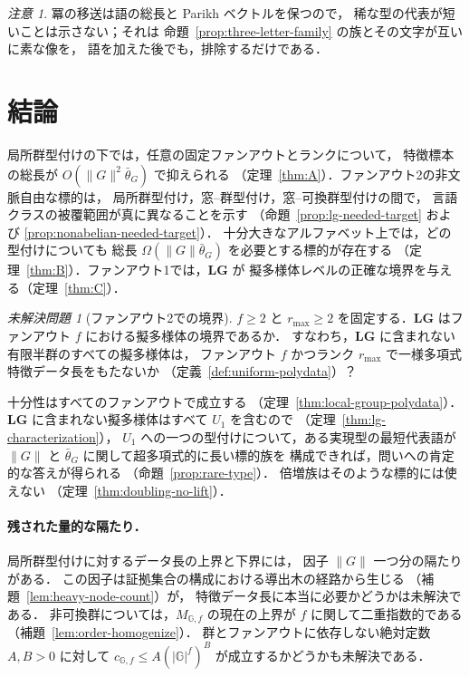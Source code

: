 \documentclass[11pt,a4paper]{ltjsarticle}
\numberwithin{equation}{section}
\theoremstyle{plain}
\theoremstyle{definition}
\theoremstyle{remark}
\newtheorem{remark}[theorem]{注意}
\newtheorem{openproblem}[theorem]{未解決問題}
\theoremstyle{plain}
\begin{document}
\begin{remark}
冪の移送は語の総長と Parikh ベクトルを保つので，
稀な型の代表が短いことは示さない；それは
命題~\ref{prop:three-letter-family} の族とその文字が互いに素な像を，
語を加えた後でも，排除するだけである．
\end{remark}

\section{結論}
\label{sec:conclusion}

局所群型付けの下では，任意の固定ファンアウトとランクについて，
特徴標本の総長が $O(\|G\|^2\bar\theta_G)$ で抑えられる
（定理~\ref{thm:A}）．ファンアウト2の非文脈自由な標的は，
局所群型付け，窓--群型付け，窓--可換群型付けの間で，
言語クラスの被覆範囲が真に異なることを示す
（命題~\ref{prop:lg-needed-target} および
\ref{prop:nonabelian-needed-target}）．
十分大きなアルファベット上では，どの型付けについても
総長 $\Omega(\|G\|\bar\theta_G)$ を必要とする標的が存在する
（定理~\ref{thm:B}）．ファンアウト1では，$\mathbf{LG}$ が
擬多様体レベルの正確な境界を与える（定理~\ref{thm:C}）．

\begin{openproblem}[ファンアウト2での境界]
\label{op:fanout-two}
$f\ge2$ と $r_{\max}\ge2$ を固定する．$\mathbf{LG}$ はファンアウト $f$ における擬多様体の境界であるか．
すなわち，$\mathbf{LG}$ に含まれない有限半群のすべての擬多様体は，
ファンアウト $f$ かつランク $r_{\max}$ で一様多項式特徴データ長をもたないか
（定義~\ref{def:uniform-polydata}）？
\end{openproblem}

十分性はすべてのファンアウトで成立する
（定理~\ref{thm:local-group-polydata}）．
$\mathbf{LG}$ に含まれない擬多様体はすべて $U_1$ を含むので
（定理~\ref{thm:lg-characterization}），
$U_1$ への一つの型付けについて，ある実現型の最短代表語が
$\|G\|$ と $\bar\theta_G$ に関して超多項式的に長い標的族を
構成できれば，問いへの肯定的な答えが得られる
（命題~\ref{prop:rare-type}）．
倍増族はそのような標的には使えない
（定理~\ref{thm:doubling-no-lift}）．

\paragraph{残された量的な隔たり．}
局所群型付けに対するデータ長の上界と下界には，
因子 $\|G\|$ 一つ分の隔たりがある．
この因子は証拠集合の構成における導出木の経路から生じる
（補題~\ref{lem:heavy-node-count}）が，
特徴データ長に本当に必要かどうかは未解決である．
非可換群については，$M_{\mathbb G,f}$ の現在の上界が
$f$ に関して二重指数的である
（補題~\ref{lem:order-homogenize}）．
群とファンアウトに依存しない絶対定数 $A,B>0$ に対して
$c_{\mathbb G,f}\le A(|\mathbb G|^f)^B$ が成立するかどうかも未解決である．
\end{document}
